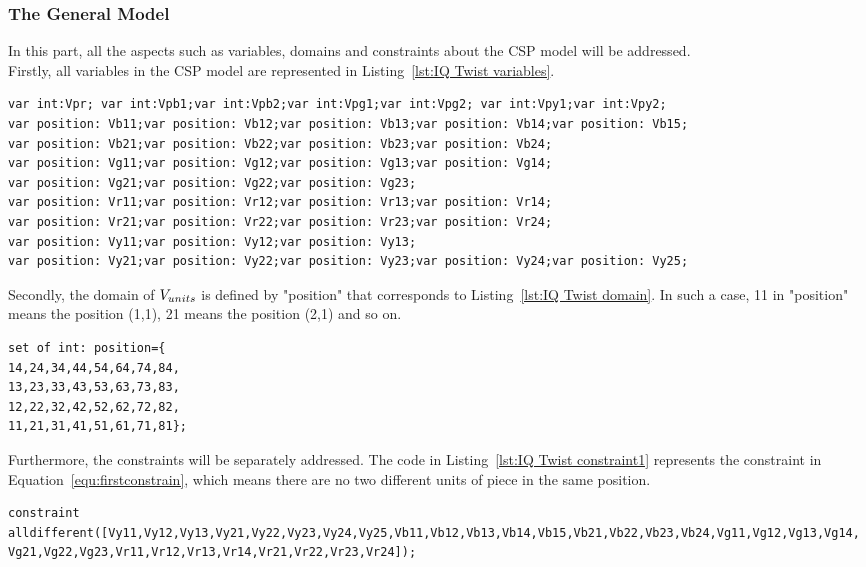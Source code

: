 \subsubsection{The General Model}
In this part, all the aspects such as variables, domains and constraints about the CSP model will be addressed.
\\Firstly, all variables in the CSP model are represented in Listing~\ref{lst:IQ Twist variables}.
\begin{lstlisting}[caption={Encoding for variables},label={lst:IQ Twist variables},language=minizinc,numbers=none]
var int:Vpr; var int:Vpb1;var int:Vpb2;var int:Vpg1;var int:Vpg2; var int:Vpy1;var int:Vpy2;
var position: Vb11;var position: Vb12;var position: Vb13;var position: Vb14;var position: Vb15;
var position: Vb21;var position: Vb22;var position: Vb23;var position: Vb24;
var position: Vg11;var position: Vg12;var position: Vg13;var position: Vg14;
var position: Vg21;var position: Vg22;var position: Vg23;
var position: Vr11;var position: Vr12;var position: Vr13;var position: Vr14; 
var position: Vr21;var position: Vr22;var position: Vr23;var position: Vr24;
var position: Vy11;var position: Vy12;var position: Vy13;
var position: Vy21;var position: Vy22;var position: Vy23;var position: Vy24;var position: Vy25;
\end{lstlisting}
\bigskip
\smallbreak
Secondly, the domain of $V_{units}$ is defined by "position" that corresponds to Listing~\ref{lst:IQ Twist domain}. In such a case, 11 in "position" means the position (1,1), 21 means the position (2,1) and so on.
\begin{lstlisting}[language=minizinc,numbers=none,caption={Encoding for pieces' domain},label={lst:IQ Twist domain}]
set of int: position={
14,24,34,44,54,64,74,84,
13,23,33,43,53,63,73,83,
12,22,32,42,52,62,72,82,
11,21,31,41,51,61,71,81};
\end{lstlisting}
\bigskip
\smallbreak
Furthermore, the constraints will be separately addressed. The code in Listing~\ref{lst:IQ Twist constraint1} represents the constraint in Equation~\ref{equ:firstconstrain}, which means there are no two different units of piece in the same position.
\begin{lstlisting}[language=minizinc,numbers=none,caption={Encoding for constraint one},label={lst:IQ Twist constraint1}]
constraint alldifferent([Vy11,Vy12,Vy13,Vy21,Vy22,Vy23,Vy24,Vy25,Vb11,Vb12,Vb13,Vb14,Vb15,Vb21,Vb22,Vb23,Vb24,Vg11,Vg12,Vg13,Vg14,
Vg21,Vg22,Vg23,Vr11,Vr12,Vr13,Vr14,Vr21,Vr22,Vr23,Vr24]);
\end{lstlisting}
